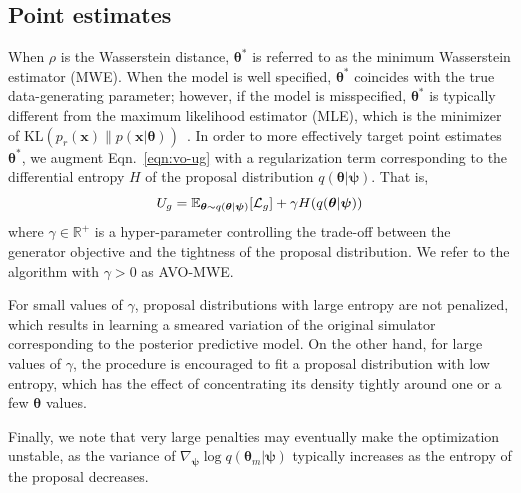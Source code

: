 \documentclass[twocolumn,superscriptaddress,aps]{revtex4-1}
\newcommand{\kcnote}[1]{\textcolor{red}{[KC: #1]}}
\newcommand{\bftheta}{{\bm \theta}}
\newcommand{\bfpsi}{{\bm \psi}}
\newcommand{\bfx}{\mathbf{x}}
\theoremstyle{plain}
\begin{document}
\subsection{Point estimates}


When $\rho$ is the Wasserstein distance, $\bftheta^*$ is referred to as the
minimum Wasserstein estimator (MWE). When the model is well specified, $\bftheta^*$
coincides with the true data-generating parameter; however, if the model is
misspecified, $\bftheta^*$ is typically different from the maximum likelihood
estimator (MLE), which is the minimizer of $\text{KL}(p_r(\bfx) \parallel p(\bfx |
\bftheta))$~\citep{bernton2017inference}. In order to more effectively target
point estimates $\bftheta^*$, we augment Eqn.~\ref{eqn:vo-ug} with a
regularization term corresponding to the differential entropy $H$ of the
proposal distribution $q(\bftheta | \bfpsi)$. That is,
\begin{equation}
    U_g = \mathbb{E}_{\bftheta \sim q(\bftheta|\bfpsi)} [ {\cal L}_g ] + \gamma H(q(\bftheta|\bfpsi))
\end{equation}
where $\gamma \in \mathbb{R}^+$ is a hyper-parameter controlling the trade-off
between the generator objective and the tightness of the proposal distribution.
We refer to the algorithm with $\gamma>0$ as AVO-MWE.

For small values of $\gamma$,
proposal distributions with large entropy are not penalized, which results
in learning a smeared variation of the original simulator corresponding to the posterior predictive model. On the other hand,
for large values of $\gamma$, the procedure is encouraged to fit a proposal
distribution with low entropy, which has the effect of concentrating its density
tightly around one or a few $\bftheta$ values.

Finally, we note that very large penalties may
eventually make the optimization unstable, as the variance of $\nabla_\bfpsi \log q(\bftheta_m|\bfpsi)$
typically increases as the entropy of the proposal decreases.

\end{document}
